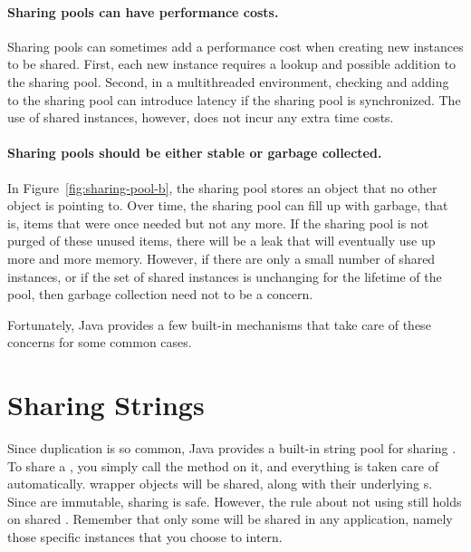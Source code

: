 \paragraph{Sharing pools can have performance costs.}
Sharing pools can sometimes add a performance cost when creating new instances
to be shared.  First, each new instance requires a lookup and possible
addition to the sharing pool. Second, in a multithreaded
environment, checking and adding to the sharing pool can introduce latency if the sharing pool is synchronized.
The use of shared instances, however, does not incur any extra
time costs.

\paragraph{Sharing pools should be either stable or garbage collected.} 
In Figure~\ref{fig:sharing-pool-b}, the sharing pool stores an object
that no other object is pointing to. Over time, the sharing pool can fill up with garbage, that is,
items that were once needed but not any more. If the
sharing pool is not purged of these unused items, there will be a
leak that will eventually use up more and more memory. 
However, if there are only a small number of shared instances,
or if the set of shared instances is unchanging for the lifetime of the pool,
then garbage collection need not to be a concern.

Fortunately, Java provides a few built-in mechanisms that take care of
these concerns for some common cases.

\section{Sharing Strings}
\label{sec:sharing-strings}


Since  duplication is so common, Java provides a built-in
string pool for sharing . To share a
, you simply call the method  on it, and everything
is taken care of automatically.  wrapper objects will be shared,
along with their underlying s. Since
 are immutable, sharing is safe.
However, the rule about not using \code{==} still holds on shared
.  Remember that only some
 will be shared in any application, namely those specific
instances that you choose to intern.

